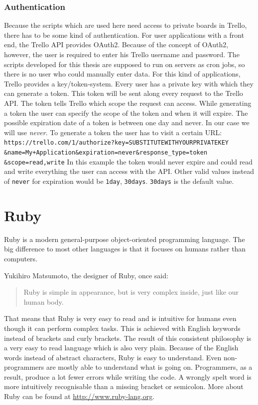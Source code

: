 \subsubsection{Authentication}
Because the scripts which are used here need access to private boards in Trello, there has to be some kind of authentication. For user applications with a front end, the Trello API provides OAuth2. Because of the concept of OAuth2, however, the user is required to enter his Trello username and password. \cite{oauth} The scripts developed for this thesis are supposed to run on servers as cron jobs, so there is no user who could manually enter data. For this kind of applications, Trello provides a key/token-system. Every user has a private key with which they can generate a token. This token will be sent along every request to the Trello API. The token tells Trello which scope the request can access. While generating a token the user can specify the scope of the token and when it will expire. The possible expiration date of a token is between one day and never. In our case we will use \emph{never}. To generate a token the user has to visit a certain URL:
\texttt{
https://trello.com/1/authorize?key=SUBSTITUTEWITHYOURPRIVATEKEY \&name=My+Application\&expiration=never\&response\_type=token \&scope=read,write}
In this example the token would never expire and could read and write everything the user can access with the API. Other valid values instead of \texttt{never} for expiration would be \texttt{1day}, \texttt{30days}. \texttt{30days} is the default value. \cite{trello:gettingstarted}


\section{Ruby}
Ruby is a modern general-purpose object-oriented programming language. The big difference to most other languages is that it focuses on humans rather than computers. 

Yukihiro Matsumoto, the designer of Ruby, once said:
\begin{quote}
Ruby is simple in appearance, but is very
complex inside, just like our human body.\cite{ruby:talk}
\end{quote}

That means that Ruby is very easy to read and is intuitive for humans even though it can perform complex tasks. This is achieved with English keywords instead of brackets and curly brackets. The result of this consistent philosophy is a very easy to read language which is also very plain. Because of the English words instead of abstract characters, Ruby is easy to understand. Even non-programmers are mostly able to understand what is going on. Programmers, as a result, produce a lot fewer errors while writing the code. A wrongly spelt word is more intuitively recognisable than a missing bracket or semicolon. \cite{ruby:about} More about Ruby can be found at \url{http://www.ruby-lang.org}.

